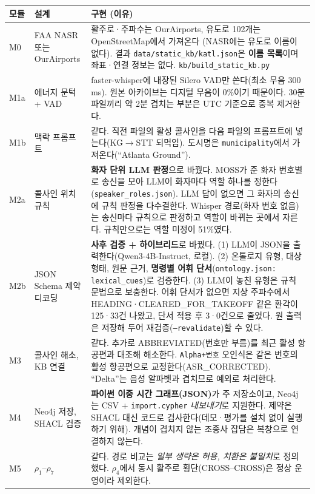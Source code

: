 \documentclass[10pt,a4paper]{article}
\newcommand{\cmd}[1]{\textsf{\small #1}}
\begin{document}
\begin{center}\small
\begin{tabularx}{\textwidth}{@{}l>{\raggedright\arraybackslash}p{4.0cm}>{\raggedright\arraybackslash}X@{}}
\toprule
모듈 & 설계 & 구현 (이유)\\\midrule
M0 & FAA NASR 또는 OurAirports & 활주로·주파수는 OurAirports, 유도로 102개는 OpenStreetMap에서 가져온다 (NASR에는 유도로 이름이 없다). 결과 \texttt{data/static\_kb/katl.json}은 \textbf{이름 목록}이며 좌표·연결 정보는 없다. \texttt{kb/build\_static\_kb.py}\\
M1a & 에너지 문턱 + VAD & faster-whisper에 내장된 Silero VAD만 쓴다(최소 무음 300\,ms). 원본 아카이브는 디지털 무음이 0\%이기 때문이다. 30분 파일끼리 약 2분 겹치는 부분은 UTC 기준으로 중복 제거한다.\\
M1b & 맥락 프롬프트 & 같다. 직전 파일의 활성 콜사인을 다음 파일의 프롬프트에 넣는다(KG$\to$STT 되먹임). 도시명은 \texttt{municipality}에서 가져온다(``Atlanta Ground'').\\
M2a & 콜사인 위치 규칙 & \textbf{화자 단위 LLM 판정}으로 바꿨다. MOSS가 준 화자 번호별로 송신을 모아 LLM이 화자마다 역할 하나를 정한다(\texttt{speaker\_roles.json}). LLM 답이 없으면 그 화자의 송신에 규칙 판정을 다수결한다. Whisper 경로(화자 번호 없음)는 송신마다 규칙으로 판정하고 역할이 바뀌는 곳에서 자른다. 규칙만으로는 역할 미정이 51\%였다.\\
M2b & JSON Schema 제약 디코딩 & \textbf{사후 검증 + 하이브리드}로 바꿨다. (1) LLM이 JSON을 출력한다(Qwen3-4B-Instruct, 로컬). (2) 온톨로지 유형, 대상 형태, 원문 근거, \textbf{명령별 어휘 단서}(\texttt{ontology.json: lexical\_cues})로 검증한다. (3) LLM이 놓친 유형은 규칙 문법으로 보충한다. 어휘 단서가 없으면 지상 주파수에서 HEADING·CLEARED\_FOR\_TAKEOFF 같은 환각이 125·33건 나왔고, 단서 적용 후 3·0건으로 줄었다. 원 출력은 저장해 두어 재검증(\texttt{--revalidate})할 수 있다.\\
M3 & 콜사인 해소, KB 연결 & 같다. 추가로 \cmd{ABBREVIATED}(번호만 부름)를 최근 활성 항공편과 대조해 해소한다. \texttt{Alpha+번호} 오인식은 같은 번호의 활성 항공편으로 교정한다(\cmd{ASR\_CORRECTED}). ``Delta''는 음성 알파벳과 겹치므로 예외로 처리한다.\\
M4 & Neo4j 저장, SHACL 검증 & \textbf{파이썬 이중 시간 그래프(JSON)}가 주 저장소이고, Neo4j는 CSV + \texttt{import.cypher} \emph{내보내기}로 지원한다. 제약은 SHACL 대신 코드로 검사한다(데모·평가를 설치 없이 실행하기 위해). 개념이 겹치지 않는 조종사 잡담은 복창으로 연결하지 않는다.\\
M5 & $\rho_1$--$\rho_7$ & 같다. 경로 비교는 \emph{일부 생략은 허용, 치환은 불일치}로 정의했다. $\rho_4$에서 동시 활주로 횡단(CROSS--CROSS)은 정상 운영이라 제외한다.\\

\end{tabularx}
\end{center}
\end{document}
